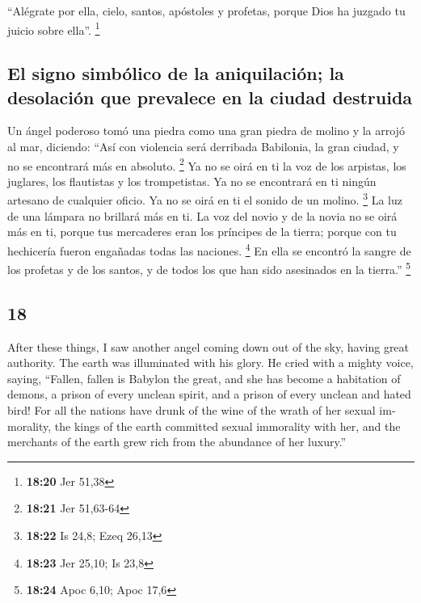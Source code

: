 \begin{paracol}{2}
 ``Alégrate por ella, cielo, santos, apóstoles y
profetas, porque Dios ha juzgado tu juicio sobre ella''. \footnote{\textbf{18:20}
  Jer 51,38}

\hypertarget{el-signo-simbuxf3lico-de-la-aniquilaciuxf3n-la-desolaciuxf3n-que-prevalece-en-la-ciudad-destruida}{%
\subsection{El signo simbólico de la aniquilación; la desolación que
prevalece en la ciudad
destruida}\label{el-signo-simbuxf3lico-de-la-aniquilaciuxf3n-la-desolaciuxf3n-que-prevalece-en-la-ciudad-destruida}}

 Un ángel poderoso tomó una piedra como una gran piedra
de molino y la arrojó al mar, diciendo: ``Así con violencia será
derribada Babilonia, la gran ciudad, y no se encontrará más en absoluto.
\footnote{\textbf{18:21} Jer 51,63-64}  Ya no se oirá en
ti la voz de los arpistas, los juglares, los flautistas y los
trompetistas. Ya no se encontrará en ti ningún artesano de cualquier
oficio. Ya no se oirá en ti el sonido de un molino. \footnote{\textbf{18:22}
  Is 24,8; Ezeq 26,13}  La luz de una lámpara no brillará
más en ti. La voz del novio y de la novia no se oirá más en ti, porque
tus mercaderes eran los príncipes de la tierra; porque con tu hechicería
fueron engañadas todas las naciones. \footnote{\textbf{18:23} Jer 25,10;
  Is 23,8}  En ella se encontró la sangre de los profetas
y de los santos, y de todos los que han sido asesinados en la tierra.''
\footnote{\textbf{18:24} Apoc 6,10; Apoc 17,6}

\switchcolumn
\begin{otherlanguage}{english}

\hypertarget{section-35}{%
\section{18}\label{section-35}}

 After these things, I saw another angel coming down out
of the sky, having great authority. The earth was illuminated with his
glory.  He cried with a mighty voice, saying, ``Fallen,
fallen is Babylon the great, and she has become a habitation of demons,
a prison of every unclean spirit, and a prison of every unclean and
hated bird!  For all the nations have drunk of the wine of
the wrath of her sexual immorality, the kings of the earth committed
sexual immorality with her, and the merchants of the earth grew rich
from the abundance of her luxury.''


\end{otherlanguage}
\end{paracol}
